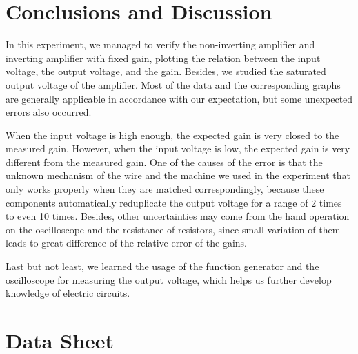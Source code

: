 \documentclass[a4paper]{report}
\begin{document}
	\section{Conclusions and Discussion}
	In this experiment, we managed to verify the non-inverting amplifier and inverting amplifier with fixed gain, plotting the relation between the input voltage, the output voltage, and the gain. Besides, we studied the saturated output voltage of the amplifier. Most of the data and the corresponding graphs are generally applicable in accordance with our expectation, but some unexpected errors also occurred.
	
	When the input voltage is high enough, the expected gain is very closed to the measured gain. However, when the input voltage is low, the expected gain is very different from the measured gain. One of the causes of the error is that the unknown mechanism of the wire and the machine we used in the experiment that only works properly when they are matched correspondingly, because these components automatically reduplicate the output voltage for a range of 2 times to even 10 times. Besides, other uncertainties may come from the hand operation on the oscilloscope and the resistance of resistors, since small variation of them leads to great difference of the relative error of the gains.
	
	Last but not least, we learned the usage of the function generator and the oscilloscope for measuring the output voltage, which helps us further develop knowledge of electric circuits.
	\vspace{10cm}
	\section*{Data Sheet}
\end{document}
